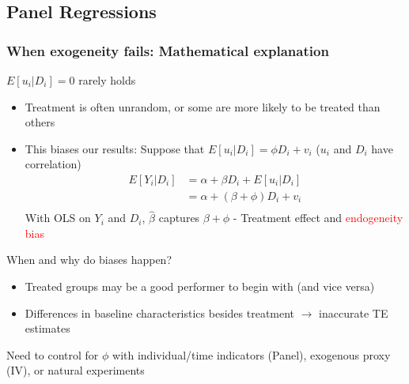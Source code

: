 \documentclass[aspectratio=169]{beamer}
\begin{document}
\subsection{Panel Regressions}
\begin{frame}
\frametitle{When exogeneity fails: Mathematical explanation} 
$E[u_i|D_i]=0$ rarely holds
\begin{itemize}\setlength\itemsep{3pt}
\item  Treatment is often unrandom, or some are more likely to be treated than others
\item This biases our results: Suppose that $E[u_i|D_i]=\phi D_i + v_i$ ($u_i$ and $D_i$ have correlation)
 \[
 \begin{aligned}
  E[Y_i|D_i]&=\alpha+\beta D_i+E[u_i|D_i]\\
  &=\alpha + (\beta+\phi)D_i + v_i\\
 \end{aligned}
\]
With OLS on $Y_i$ and $D_i$, $\hat{\beta}$ captures $\beta+\phi$ - Treatment effect and \textcolor{red}{endogeneity bias}
\end{itemize} \medskip
When and why do biases happen?
\begin{itemize}\setlength\itemsep{3pt}
\item Treated groups may be a good performer to begin with (and vice versa)
\item Differences in baseline characteristics besides treatment $\to$ inaccurate TE estimates
\end{itemize}\medskip
Need to control for $\phi$ with individual/time indicators (Panel), exogenous proxy (IV), or natural experiments
\end{frame}
\end{document}
